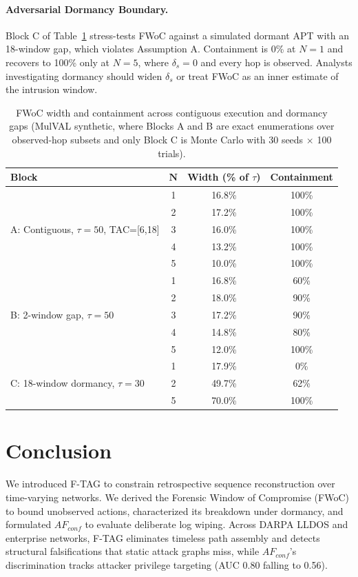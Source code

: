 \documentclass[12pt]{article}
\begin{document}
\paragraph{Adversarial Dormancy Boundary.}\label{sec:adversarial-dormancy} Block C of Table~\ref{tab:dormant-apt} stress-tests FWoC against a simulated dormant APT with an 18-window gap, which violates Assumption A. Containment is 0\% at $N=1$ and recovers to 100\% only at $N=5$, where $\delta_s=0$ and every hop is observed. Analysts investigating dormancy should widen $\delta_s$ or treat FWoC as an inner estimate of the intrusion window.

\begin{table}[tb]
\centering
\caption{FWoC width and containment across contiguous execution and dormancy gaps (MulVAL synthetic, where Blocks A and B are exact enumerations over observed-hop subsets and only Block C is Monte Carlo with 30 seeds $\times$ 100 trials).}
\label{tab:dormant-apt}
\footnotesize
\begin{tabular}{lccc}
\toprule
\textbf{Block} & $\mathbf{N}$ & \textbf{Width (\% of $\tau$)} & \textbf{Containment} \\
\midrule
\multirow{5}{*}{A: Contiguous, $\tau=50$, TAC=[6,18]} 
 & 1 & 16.8\% & 100\% \\
 & 2 & 17.2\% & 100\% \\
 & 3 & 16.0\% & 100\% \\
 & 4 & 13.2\% & 100\% \\
 & 5 & 10.0\% & 100\% \\
\midrule
\multirow{5}{*}{B: 2-window gap, $\tau=50$} 
 & 1 & 16.8\% & 60\% \\
 & 2 & 18.0\% & 90\% \\
 & 3 & 17.2\% & 90\% \\
 & 4 & 14.8\% & 80\% \\
 & 5 & 12.0\% & 100\% \\
\midrule
\multirow{3}{*}{C: 18-window dormancy, $\tau=30$} 
 & 1 & 17.9\% & 0\% \\
 & 2 & 49.7\% & 62\% \\
 & 5 & 70.0\% & 100\% \\
\bottomrule
\end{tabular}
\end{table}

\section{Conclusion}\label{sec:conclusion}
We introduced F-TAG to constrain retrospective sequence reconstruction over time-varying networks. We derived the Forensic Window of Compromise (FWoC) to bound unobserved actions, characterized its breakdown under dormancy, and formulated $AF_{conf}$ to evaluate deliberate log wiping. Across DARPA LLDOS and enterprise networks, F-TAG eliminates timeless path assembly and detects structural falsifications that static attack graphs miss, while $AF_{conf}$'s discrimination tracks attacker privilege targeting (AUC 0.80 falling to 0.56).
\end{document}
